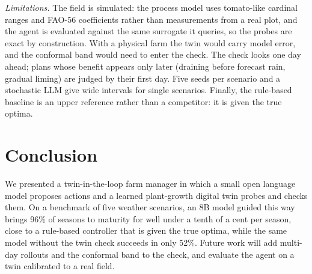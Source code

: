 \documentclass[conference]{IEEEtran}
\begin{document}
\textit{Limitations.} The field is simulated: the process model uses tomato-like cardinal
ranges and FAO-56 coefficients rather than measurements from a real plot, and the agent is
evaluated against the same surrogate it queries, so the probes are exact by construction. With
a physical farm the twin would carry model error, and the conformal band would need to enter
the check. The check looks one day ahead; plans whose benefit appears only later (draining
before forecast rain, gradual liming) are judged by their first day. Five seeds per scenario
and a stochastic LLM give wide intervals for single scenarios. Finally, the rule-based
baseline is an upper reference rather than a competitor: it is given the true optima.

\section{Conclusion}

We presented a twin-in-the-loop farm manager in which a small open language model proposes
actions and a learned plant-growth digital twin probes and checks them. On a benchmark of five
weather scenarios, an 8B model guided this way brings 96\% of seasons to maturity for well
under a tenth of a cent per season, close to a rule-based controller that is given the true
optima, while the same model without the twin check succeeds in only 52\%. Future work will add
multi-day rollouts and the conformal band to the check, and evaluate the agent on a twin
calibrated to a real field.



\end{document}
